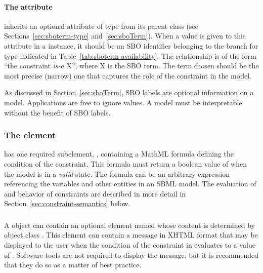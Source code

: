 \paragraph{The  attribute}
\label{sec:constraint-sboterm}

\Constraint inherits an optional 
attribute of type  from its parent
class \SBase (see Sections~\ref{sec:sboterm-type}
and~\ref{sec:sboTerm}).  When a value is given to this
attribute in a  \Constraint instance, it should be an
SBO identifier belonging to the branch for type  \Constraint
indicated in Table~\ref{tab:sboterm-availability}.  The relationship is
of the form ``the constraint \emph{is-a} X'', where X is
the SBO term.  The term chosen should be the most precise (narrow)
one that captures the role of the constraint in the model.

As discussed in Section~\ref{sec:sboTerm}, SBO labels are optional
information on a model.  Applications are free to ignore
 values.  A model must be interpretable without the
benefit of SBO labels.


\subsubsection{The  element}

\Constraint has one required subelement, ,
containing a MathML formula defining the condition of the
constraint.  This formula must return a boolean value of
 when the model is in a \emph{valid} state.  The formula
can be an arbitrary expression referencing the variables and other
entities in an SBML model.  The evaluation of  and
behavior of constraints are described in more detail in
Section~\ref{sec:constraint-semantics} below.


\subsubsection{}
\label{sec:constraint-message}

A \Constraint object can contain an optional element named
 whose content is determined by object class \Message.
This element can contain a message in XHTML format that may be
displayed to the user when the condition of the constraint in
 evaluates to a value of .  Software tools
are not required to display the message, but it is recommended
that they do so as a matter of best practice.


